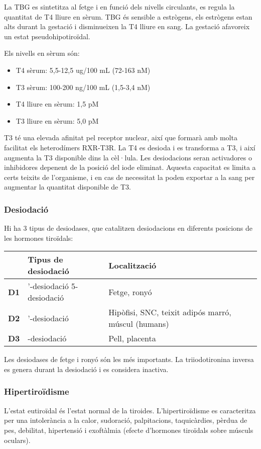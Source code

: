 La TBG es sintetitza al fetge i en funció dels nivells circulants, es
regula la quantitat de T4 lliure en sèrum. TBG és sensible a
estrògens, els estrògens estan alts durant la gestació i disminueixen
la T4 lliure en sang. La gestació afavoreix un estat
pseudohipotiroïdal.

Els nivells en sèrum són:
\begin{itemize}
\item T4 sèrum: 5,5-12,5 ug/100 mL (72-163 nM)
\item T3 sèrum: 100-200 ng/100 mL (1,5-3,4 nM)
\item T4 lliure en sèrum: 1,5 pM
\item T3 lliure en sèrum: 5,0 pM
\end{itemize}

T3 té una elevada afinitat pel receptor nuclear, així que formarà amb
molta facilitat els heterodímers RXR-T3R. La T4 es desioda i es
transforma a T3, i així augmenta la T3 disponible dins la
cèl·lula. Les desiodacions seran activadores o inhibidores depenent de
la posició del iode eliminat. Aquesta capacitat es limita a certs
teixits de l'organisme, i en cas de necessitat la poden exportar a la
sang per augmentar la quantitat disponible de T3.

\subsubsection{Desiodació}
\label{sec:desiodacio}
Hi ha 3 tipus de desiodases, que catalitzen desiodacions en diferents
posicions de les hormones tiroïdals:

\begin{table}[H]
\centering
\begin{tabular}{c>{\centering}m{3cm}>{\centering}m{5cm}}
\cline{2-3} 
 & \textbf{Tipus de desiodació} & \textbf{Localització}\tabularnewline
\hline 
\textbf{D1} & 5'-desiodació 5-desiodació & Fetge, ronyó\tabularnewline
\textbf{D2} & 5'-desiodació & Hipòfisi, SNC, teixit adipós marró, múscul (humans)\tabularnewline
\textbf{D3} & 5-desiodació & Pell, placenta\tabularnewline
\hline 
\end{tabular}
\end{table}

Les desiodases de fetge i ronyó són les més importants. La
triiodotironina inversa es genera durant la desiodació i es considera
inactiva.

\subsubsection{Hipertiroïdisme}
\label{sec:hipertiroidisme}
L'estat eutiroïdal és l'estat normal de la tiroides. L'hipertiroïdisme
es caracteritza per una intolerància a la calor, sudoració,
palpitacions, taquicàrdies, pèrdua de pes, debilitat, hipertensió i
exoftàlmia (efecte d'hormones tiroïdals sobre músculs oculars).

